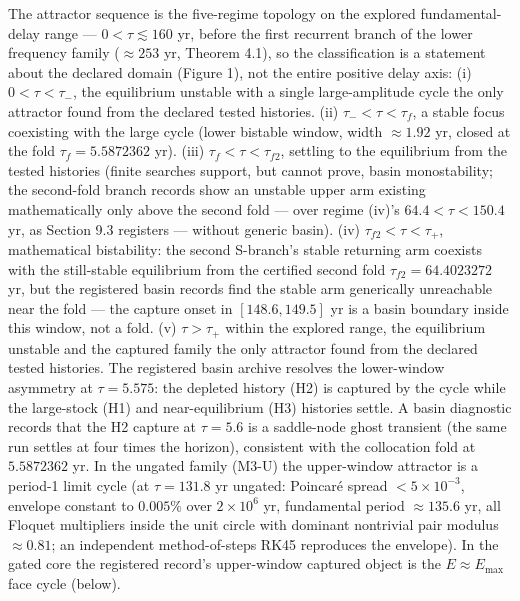 \documentclass[11pt]{article}
\begin{document}
The attractor sequence is the five-regime topology on the explored
fundamental-delay range --- \(0 < \tau \lesssim 160\) yr, before the
first recurrent branch of the lower frequency family (\(\approx253\) yr,
Theorem 4.1), so the classification is a statement about the declared
domain (Figure 1), not the entire positive delay axis: (i)
\(0 < \tau < \tau_-\), the equilibrium unstable with a single
large-amplitude cycle the only attractor found from the declared tested
histories. (ii) \(\tau_- < \tau < \tau_f\), a stable focus coexisting
with the large cycle (lower bistable window, width \(\approx1.92\) yr,
closed at the fold \(\tau_f = 5.5872362\) yr). (iii)
\(\tau_f < \tau < \tau_{f2}\), settling to the equilibrium from the
tested histories (finite searches support, but cannot prove, basin
monostability; the second-fold branch records show an unstable upper arm
existing mathematically only above the second fold --- over regime
(iv)'s \(64.4 < \tau < 150.4\) yr, as Section 9.3 registers --- without
generic basin). (iv) \(\tau_{f2} < \tau < \tau_+\), mathematical
bistability: the second S-branch's stable returning arm coexists with
the still-stable equilibrium from the certified second fold
\(\tau_{f2} = 64.4023272\) yr, but the registered basin records find the
stable arm generically unreachable near the fold --- the capture onset
in \([148.6, 149.5]\) yr is a basin boundary inside this window, not a
fold. (v) \(\tau > \tau_+\) within the explored range, the equilibrium
unstable and the captured family the only attractor found from the
declared tested histories. The registered basin archive resolves the
lower-window asymmetry at \(\tau = 5.575\): the depleted history (H2) is
captured by the cycle while the large-stock (H1) and near-equilibrium
(H3) histories settle. A basin diagnostic records that the H2 capture at
\(\tau = 5.6\) is a saddle-node ghost transient (the same run settles at
four times the horizon), consistent with the collocation fold at
\(5.5872362\) yr. In the ungated family (M3-U) the upper-window
attractor is a period-1 limit cycle (at \(\tau = 131.8\) yr ungated:
Poincar\'e spread \(<5\times10^{-3}\), envelope constant to \(0.005\%\)
over \(2\times10^6\) yr, fundamental period \(\approx135.6\) yr, all
Floquet multipliers inside the unit circle with dominant nontrivial pair
modulus \(\approx0.81\); an independent method-of-steps RK45 reproduces
the envelope). In the gated core the registered record's upper-window
captured object is the \(E \approx E_{\max}\) face cycle (below).
\end{document}
